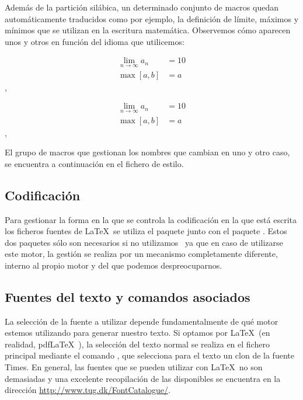 Además de la partición silábica, un determinado conjunto de macros quedan automáticamente traducidos como por ejemplo, la definición de límite, máximos y mínimos que se utilizan en la escritura matemática. Observemos cómo aparecen unos y otros en función del idioma que utilicemos:
\begin{LTXexample}[pos=r, hsep=15pt,width=0.45\textwidth]
\begin{align*}
\lim_{n\to\infty}a_{n}&=10\\
\max\left[{a,b}\right]&=a
\end{align*}
\figurename, \tablename

\begin{align*}
\lim_{n\to\infty}a_{n}&=10\\
\max\left[{a,b}\right]&=a
\end{align*}
\figurename, \tablename
{} 
\end{LTXexample}

El grupo de macros que gestionan los nombres que cambian en uno y otro caso, se encuentra a continuación en el fichero de estilo. 
\subsection{Codificación}
Para gestionar la forma en la que se controla la codificación en la que está escrita los ficheros fuentes de \LaTeX\ se utiliza el paquete  junto con el paquete . Estos dos paquetes sólo son necesarios si no utilizamos \LuaLaTeX\ ya que en caso de utilizarse este motor, la gestión se realiza por un mecanismo completamente diferente, interno al propio motor y del que podemos despreocuparnos. 

\subsection{Fuentes del texto y comandos asociados}
La selección de la fuente a utilizar depende fundamentalmente de qué motor estemos utilizando para generar nuestro texto. Si optamos por \LaTeX\ (en realidad, pdf\LaTeX\ ), la selección del texto normal se realiza en el fichero principal mediante el comando , que selecciona para el texto un clon de la fuente Times. En general, las fuentes que se pueden utilizar con \LaTeX\ no son demasiadas y una excelente recopilación de las disponibles se encuentra en la dirección \url{http://www.tug.dk/FontCatalogue/}. 


